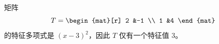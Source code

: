 \begin{example}   \label{ex:SingJordBlock}
矩阵
\begin{equation*}
  T=\begin{mat}[r]
      2  &-1  \\
      1  &4
    \end{mat}
\end{equation*}
的特征多项式是 \( (x-3)^2 \)，因此 \( T \) 仅有一个特征值 \( 3 \)。


\end{example}
